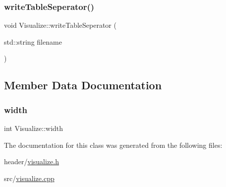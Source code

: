 \mbox{\label{class_visualize_ac5530b8e917c748163e621cf5677eeb5_ac5530b8e917c748163e621cf5677eeb5}} 
\subsubsection{\texorpdfstring{write\+Table\+Seperator()}{writeTableSeperator()}}
{\footnotesize\ttfamily void Visualize\+::write\+Table\+Seperator (\begin{DoxyParamCaption}\item[{std\+::string}]{filename }\end{DoxyParamCaption})}



\subsection{Member Data Documentation}
\mbox{\label{class_visualize_af5ac723ad5f8fe8c4a8378bf1299cda7_af5ac723ad5f8fe8c4a8378bf1299cda7}} 
\subsubsection{\texorpdfstring{width}{width}}
{\footnotesize\ttfamily int Visualize\+::width}



The documentation for this class was generated from the following files\+:\begin{DoxyCompactItemize}
\item 
header/\hyperlink{visualize_8h}{visualize.\+h}\item 
src/\hyperlink{visualize_8cpp}{visualize.\+cpp}\end{DoxyCompactItemize}
